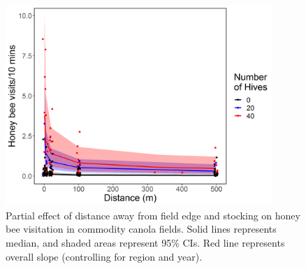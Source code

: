 \documentclass[12pt]{article} %
\begin{document}
\begin{figure}
    \centering
    \includegraphics[width=0.9\textwidth,keepaspectratio=true]{slopeNumHivesDistVis.png}
    \caption[Partial effect of distance away from field edge and stocking on honey bee visitation in commodity canola fields]{Partial effect of distance away from field edge and stocking on honey bee visitation in commodity canola fields. Solid lines represents median, and shaded areas represent 95\% CIs. Red line represents overall slope (controlling for region and year).}
    \label{fig:hbeeDist_commodity}
\end{figure}
\end{document}
